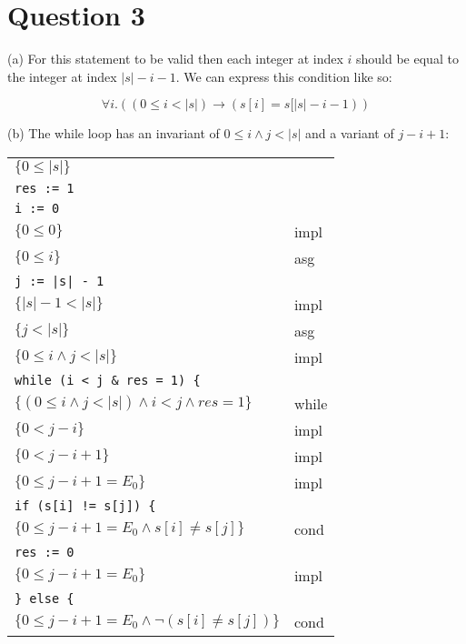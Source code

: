 \documentclass[12pt]{article}
\begin{document}
\section*{Question 3}

\noindent (a) For this statement to be valid then each integer at index $i$ should be equal to the integer at index $|s| - i - 1$. We can express this condition like so:

$$\forall i.((0 \le i < |s|) \to (s[i] = s[|s| - i - 1))$$

\noindent (b) The while loop has an invariant of $0 \le i \wedge j < |s|$ and a variant of $j - i + 1$:

\begin{center}
    \begin{tabular}{ll}
        $\{ 0 \le |s| \}$ & \\
        {\color{gray} \texttt{res := 1}} & \\
        {\color{gray} \texttt{i := 0}} & \\
        $\{ 0 \le 0 \}$ & impl \\
        $\{ 0 \le i \}$ & asg \\
        {\color{gray} \texttt{j := |s| - 1}} & \\
        $\{ |s| - 1 < |s| \}$ & impl \\
        $\{ j < |s| \}$ & asg \\
        $\{ 0 \le i \wedge j < |s| \}$ & impl \\
        {\color{gray} \texttt{while (i < j \& res = 1) \{}} & \\
        \qquad $\{ (0 \le i \wedge j < |s|) \wedge i < j \wedge res = 1 \}$ & while \\
        \qquad $\{ 0 < j - i \}$ & impl \\
        \qquad $\{ 0 < j - i + 1 \}$ & impl \\
        \qquad $\{ 0 \le j - i + 1 = E_0 \}$ & impl \\
        {\color{gray} \qquad \texttt{if (s[i] != s[j]) \{}} & \\
        \qquad \qquad $\{ 0 \le j - i + 1 = E_0 \wedge s[i] \neq s[j] \}$ & cond \\
        {\color{gray} \qquad \qquad \texttt{res := 0}} & \\
        \qquad \qquad $\{ 0 \le j - i + 1 = E_0 \}$ & impl \\
        {\color{gray} \qquad \texttt{\} else \{}} & \\
        \qquad \qquad $\{ 0 \le j - i + 1 = E_0 \wedge \neg (s[i] \neq s[j]) \}$ & cond \\

\end{tabular}
\end{center}
\end{document}
